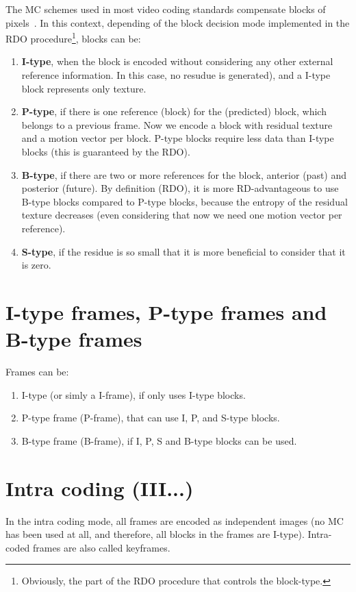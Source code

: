 The MC schemes used in most video coding standards compensate blocks
of pixels~\cite{vruiz__BBMC}. In this context, depending of the block
decision mode implemented in the RDO procedure\footnote{Obviously, the
  part of the RDO procedure that controls the block-type.}, blocks can
be:
\begin{enumerate}
\item \textbf{I-type}, when the block is encoded without considering
  any other external reference information. In this case, no resudue
  is generated), and a I-type block represents only texture.
\item \textbf{P-type}, if there is one reference (block) for the
  (predicted) block, which belongs to a previous frame. Now we encode
  a block with residual texture and a motion vector per block. P-type
  blocks require less data than I-type blocks (this is guaranteed by
  the RDO).
\item \textbf{B-type}, if there are two or more references for the
  block, anterior (past) and posterior (future). By definition (RDO),
  it is more RD-advantageous to use B-type blocks compared to P-type
  blocks, because the entropy of the residual texture decreases (even
  considering that now we need one motion vector per reference).
\item \textbf{S-type}, if the residue is so small that it is more
  beneficial to consider that it is zero.
\end{enumerate}

\section{I-type frames, P-type frames and B-type frames}

Frames can be:

\begin{enumerate}
\item I-type (or simly a I-frame), if only uses I-type blocks.
\item P-type frame (P-frame), that can use I, P, and S-type blocks.
\item B-type frame (B-frame), if I, P, S and B-type blocks can be
  used.
\end{enumerate}

\section{Intra coding (III...)}

In the intra coding mode, all frames are encoded as independent
images (no MC has been used at all, and therefore, all blocks in the
frames are I-type). Intra-coded frames are also called keyframes.

